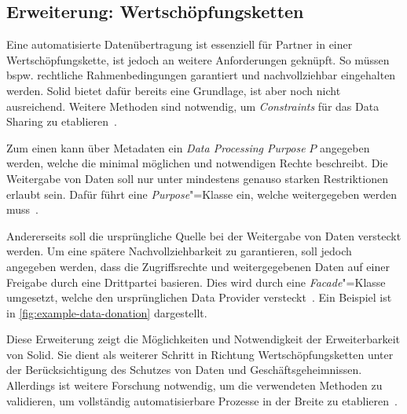 \subsection{Erweiterung: Wertschöpfungsketten}

Eine automatisierte Datenübertragung ist essenziell für Partner in einer Wertschöpfungskette, ist jedoch an weitere Anforderungen geknüpft.
So müssen bspw. rechtliche Rahmenbedingungen garantiert und nachvollziehbar eingehalten werden.
Solid bietet dafür bereits eine Grundlage, ist aber noch nicht ausreichend.
Weitere Methoden sind notwendig, um \emph{Constraints} für das Data Sharing zu etablieren~\cite{bothSolidBasedB2BData2025}.

Zum einen kann über Metadaten ein \emph{Data Processing Purpose} $P$ angegeben werden, welche die minimal möglichen und notwendigen Rechte beschreibt.
Die Weitergabe von Daten soll nur unter mindestens genauso starken Restriktionen erlaubt sein.
Dafür führt \cite{bothSolidBasedB2BData2025} eine \emph{Purpose}"=Klasse ein, welche weitergegeben werden muss~\cite{bothSolidBasedB2BData2025}.

Andererseits soll die ursprüngliche Quelle bei der Weitergabe von Daten versteckt werden.
Um eine spätere Nachvollziehbarkeit zu garantieren, soll jedoch angegeben werden, dass die Zugriffsrechte und weitergegebenen Daten auf einer Freigabe durch eine Drittpartei basieren.
Dies wird durch eine \emph{Facade}"=Klasse umgesetzt, welche den ursprünglichen Data Provider versteckt~\cite{bothSolidBasedB2BData2025}. Ein Beispiel ist in \autoref{fig:example-data-donation} dargestellt.

Diese Erweiterung zeigt die Möglichkeiten und Notwendigkeit der Erweiterbarkeit von Solid.
Sie dient als weiterer Schritt in Richtung Wertschöpfungsketten unter der Berücksichtigung des Schutzes von Daten und Geschäftsgeheimnissen.
Allerdings ist weitere Forschung notwendig, um die verwendeten Methoden zu validieren, um vollständig automatisierbare Prozesse in der Breite zu etablieren~\cite{bothSolidBasedB2BData2025}.
